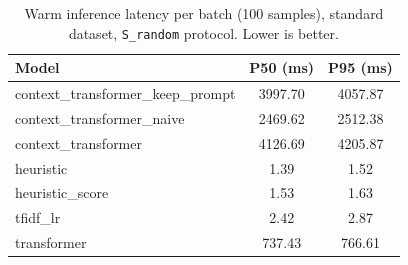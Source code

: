 \begin{table}[htbp]
\centering
\caption{ASR reduction at different TPR operating points on the standard dataset. Higher is better.}
\label{tab:asr-results}
\end{table}

\begin{table}[htbp]
\centering
\caption{Warm inference latency per batch (100 samples), standard dataset, \texttt{S\_random} protocol. Lower is better.}
\label{tab:latency-results}
\begin{tabular}{lcc}
\toprule
Model & P50 (ms) & P95 (ms) \\
\midrule
context\_transformer\_keep\_prompt & 3997.70 & 4057.87 \\
context\_transformer\_naive & 2469.62 & 2512.38 \\
context\_transformer & 4126.69 & 4205.87 \\
heuristic & 1.39 & 1.52 \\
heuristic\_score & 1.53 & 1.63 \\
tfidf\_lr & 2.42 & 2.87 \\
transformer & 737.43 & 766.61 \\
\bottomrule
\end{tabular}
\end{table}

